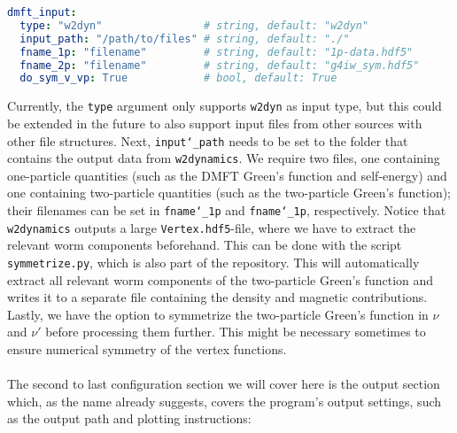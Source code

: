 \documentclass[../../main.tex]{subfiles}
\begin{document}
\begin{minipage}{\textwidth}%
\begin{lstlisting}[language=yaml]
dmft_input:
  type: "w2dyn"                # string, default: "w2dyn"
  input_path: "/path/to/files" # string, default: "./"
  fname_1p: "filename"         # string, default: "1p-data.hdf5"
  fname_2p: "filename"         # string, default: "g4iw_sym.hdf5"
  do_sym_v_vp: True            # bool, default: True
\end{lstlisting}
\end{minipage}
Currently, the \texttt{type} argument only supports \texttt{w2dyn} as input type, but this could be extended in the future to also support input files from other sources with other file structures. Next, \texttt{input\char`_path} needs to be set to the folder that contains the output data from \texttt{w2dynamics}. We require two files, one containing one-particle quantities (such as the DMFT Green's function and self-energy) and one containing two-particle quantities (such as the two-particle Green's function); their filenames can be set in \texttt{fname\char`_1p} and \texttt{fname\char`_1p}, respectively. Notice that \texttt{w2dynamics} outputs a large \texttt{Vertex.hdf5}-file, where we have to extract the relevant worm components beforehand. This can be done with the script \texttt{symmetrize.py}, which is also part of the repository. This will automatically extract all relevant worm components of the two-particle Green's function and writes it to a separate file containing the density and magnetic contributions. Lastly, we have the option to symmetrize the two-particle Green's function in $\nu$ and $\nu'$ before processing them further. This might be necessary sometimes to ensure numerical symmetry of the vertex functions.
\\\\
The second to last configuration section we will cover here is the output section which, as the name already suggests, covers the program's output settings, such as the output path and plotting instructions: 
 
\end{document}
